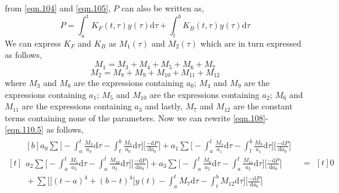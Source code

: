 \documentclass{article}
\begin{document}
from \eqref{eqn.104} and \eqref{eqn.105}, $P$ can also be written as,
\begin{equation}\label{eqn.111}
P = \int_{a}^{t} K_{F}(t,\tau)y(\tau)\mathrm{d}\tau + \int_{t}^{b} K_{B}(t,\tau)y(\tau)\mathrm{d}\tau
\end{equation}
We can express $K_{F}$ and $K_{B}$ as $M_{1}(\tau)$ and $M_{2}(\tau)$ which are in turn expressed as follows,
\begin{equation}\label{eqn.112}
M_{1} = M_{3} + M_{4} + M_{5} + M_{6} + M_{7}
\end{equation}
\begin{equation}\label{eqn.113}
M_{2} = M_{8} + M_{9} + M_{10} + M_{11} + M_{12}
\end{equation}
where $M_{3}$ and $M_{8}$ are the expressions containing $a_{0}$; $M_{4}$ and $M_{9}$ are the expressions containing $a_{1}$; $M_{5}$ and $M_{10}$ are the expressions containing $a_{2}$; $M_{6}$ and $M_{11}$ are the expressions containing $a_{3}$ and lastly, $M_{7}$ and $M_{12}$ are the constant terms containing none of the parameters. Now we can rewrite  \eqref{eqn.108}- \eqref{eqn.110.5} as follows, 
\begin{equation}\label{eqn.114}
\begin{aligned}[t]
	\begin{aligned}[b]
	a_{0} \sum \bigg[-\int_{a}^{t}\frac{M_{3}}{a_{0}}\mathrm{d}\tau-\int_{t}^{b}\frac{M_{8}}{a_{0}}\mathrm{d}\tau\bigg] \bigg[\frac{-\mathrm{d}P}{\mathrm{d}a_{0}}\bigg] + a_{1} \sum \bigg[-\int_{a}^{t}\frac{M_{4}}{a_{1}}\mathrm{d}\tau-\int_{t}^{b}\frac{M_{9}}{a_{1}}\mathrm{d}\tau\bigg] \bigg[\frac{-\mathrm{d}P}{\mathrm{d}a_{0}}\bigg] \\
	a_{2} \sum \bigg[-\int_{a}^{t}\frac{M_{5}}{a_{2}}\mathrm{d}\tau-\int_{a}^{t}\frac{M_{10}}{a_{2}}\mathrm{d}\tau\bigg] \bigg[\frac{-\mathrm{d}P}{\mathrm{d}a_{0}}\bigg] + a_{3} \sum \bigg[-\int_{a}^{t}\frac{M_{6}}{a_{2}}\mathrm{d}\tau-\int_{a}^{t}\frac{M_{11}}{a_{2}}\mathrm{d}\tau\bigg] \bigg[\frac{-\mathrm{d}P}{\mathrm{d}a_{0}}\bigg] \\ 
	{} +\sum\bigg[\big[(t-a)^4+(b-t)^4\big]y(t) -\int_{a}^{t}{M_{7}}\mathrm{d}\tau-\int_{t}^{b}{M_{12}}\mathrm{d}\tau \bigg]\bigg[\frac{-\mathrm{d}P}{\mathrm{d}a_{0}}\bigg]
	\end{aligned}
	& =
	\begin{aligned}[t]
	0
	\end{aligned}
\end{aligned}
\end{equation}
\end{document}
